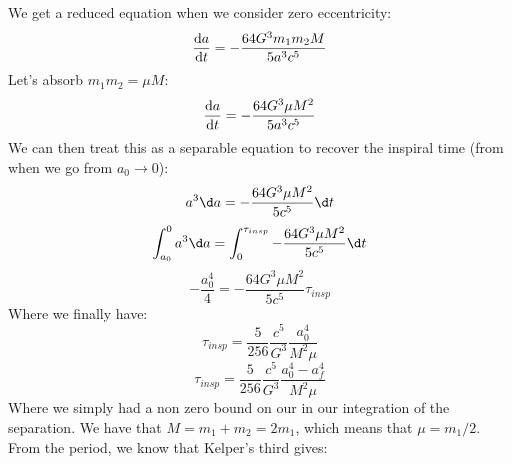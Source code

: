 We get a reduced equation when we consider zero eccentricity:
\begin{equation}
    \odv{a}{t} = -\frac{64G^3m_1m_2M}{5a^3c^5}
\end{equation}
Let's absorb $m_1m_2 = \mu M$:
\begin{equation}
    \odv{a}{t} = -\frac{64G^3\mu M^2}{5a^3c^5}
\end{equation}
We can then treat this as a separable equation to recover the inspiral time (from when we go from $a_0\rightarrow 0$):
\begin{equation}
    a^3\d a = -\frac{64G^3\mu M^2}{5c^5}\d t
\end{equation}
\begin{equation}
    \int_{a_0}^{0}a^3 \d a = \int_{0}^{\tau_{insp}}- \frac{64G^3\mu M^2}{5c^5}\d t
\end{equation}
\begin{equation}
    -\frac{a_0^4}{4} = -\frac{64G^3\mu M^2}{5c^5} \tau_{insp}
\end{equation}
Where we finally have:
\begin{equation}
    \tau_{insp} = \frac{5}{256}\frac{c^5}{G^3}\frac{a_0^4}{M^2\mu}
\end{equation}
\begin{equation}
    \tau_{insp} = \frac{5}{256}\frac{c^5}{G^3}\frac{a_0^4-a_f^4}{M^2\mu}
\end{equation}
Where we simply had a non zero bound on our in our integration of the separation.
We have that $M = m_1 + m_2 = 2m_1$, which means that $\mu = m_1/2$. From the period, we know that Kelper's third gives:
